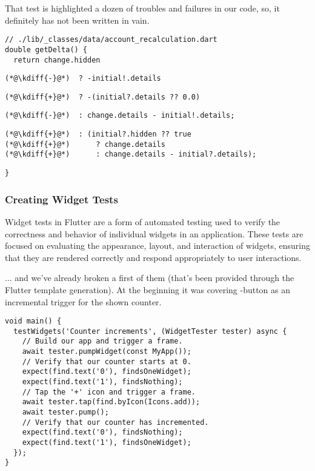\noindent That test is highlighted a dozen of troubles and failures in our code, so, it definitely has not been 
written in vain.

\begin{lstlisting}[firstnumber=17]
// ./lib/_classes/data/account_recalculation.dart
double getDelta() {
  return change.hidden
\end{lstlisting}
{
\xpretocmd{\lstlisting}{\vspace{-12pt}}{}{}
\begin{lstlisting}[firstnumber=20, backgroundcolor=\color{backred}]
(*@\kdiff{-}@*)  ? -initial!.details
\end{lstlisting}
\begin{lstlisting}[firstnumber=20, backgroundcolor=\color{backgreen}]
(*@\kdiff{+}@*)  ? -(initial?.details ?? 0.0)
\end{lstlisting}
\begin{lstlisting}[firstnumber=21, backgroundcolor=\color{backred}]
(*@\kdiff{-}@*)  : change.details - initial!.details;
\end{lstlisting}
\begin{lstlisting}[firstnumber=21, backgroundcolor=\color{backgreen}]
(*@\kdiff{+}@*)  : (initial?.hidden ?? true
(*@\kdiff{+}@*)      ? change.details
(*@\kdiff{+}@*)      : change.details - initial?.details);
\end{lstlisting}
\begin{lstlisting}[firstnumber=24]
}
\end{lstlisting}
}


\subsubsection{Creating Widget Tests} \label{widget-tests}

Widget tests in Flutter are a form of automated testing used to verify the correctness and behavior of individual 
widgets in an application. These tests are focused on evaluating the appearance, layout, and interaction of widgets, 
ensuring that they are rendered correctly and respond appropriately to user interactions.

\noindent ... and we've already broken a first of them (that's been provided through the Flutter template generation). 
At the beginning it was covering -button as an incremental trigger for the shown counter.

\begin{lstlisting}
void main() {
  testWidgets('Counter increments', (WidgetTester tester) async {
    // Build our app and trigger a frame.
    await tester.pumpWidget(const MyApp());
    // Verify that our counter starts at 0.
    expect(find.text('0'), findsOneWidget);
    expect(find.text('1'), findsNothing);
    // Tap the '+' icon and trigger a frame.
    await tester.tap(find.byIcon(Icons.add));
    await tester.pump();
    // Verify that our counter has incremented.
    expect(find.text('0'), findsNothing);
    expect(find.text('1'), findsOneWidget);
  });
}
\end{lstlisting}

